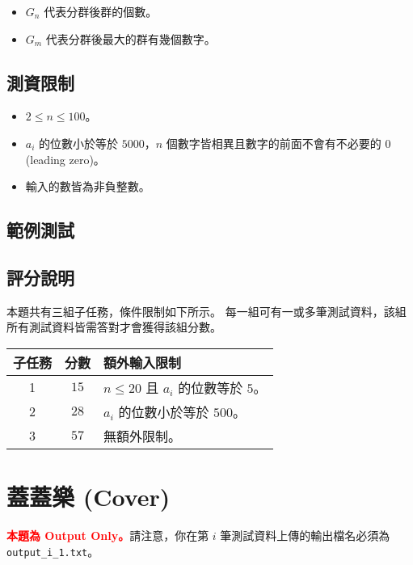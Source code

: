 \begin{itemize}
\tightlist
\item
  \(G_n\) 代表分群後群的個數。
\item
  \(G_m\) 代表分群後最大的群有幾個數字。
\end{itemize}

\subsection{測資限制}

\begin{itemize}
\tightlist
\item
  \(2 \le n \le 100\)。
\item
  \(a_i\) 的位數小於等於 \(5000\)，\(n\)
  個數字皆相異且數字的前面不會有不必要的 \(0\) (leading zero)。
\item
  輸入的數皆為非負整數。
\end{itemize}

\subsection{範例測試}

\begin{example}
%
%
\end{example}

\subsection{評分說明}

本題共有三組子任務，條件限制如下所示。
每一組可有一或多筆測試資料，該組所有測試資料皆需答對才會獲得該組分數。

\begin{longtable}[]{@{}ccl@{}}
\toprule
子任務 & 分數 & 額外輸入限制 \\
\midrule
\endhead
1 & \(15\) & \(n \le 20\) 且 \(a_i\) 的位數等於 \(5\)。 \\
2 & \(28\) & \(a_i\) 的位數小於等於 \(500\)。 \\
3 & \(57\) & 無額外限制。 \\
\bottomrule
\end{longtable}

\section{蓋蓋樂 (Cover)}

\textcolor{red}{\textbf{本題為 Output Only。}}請注意，你在第 \(i\)
筆測試資料上傳的輸出檔名必須為 \texttt{output\_i\_1.txt}。

